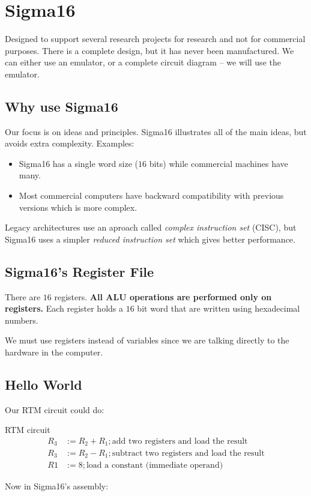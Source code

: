 \section{Sigma16}\label{sec:sigma16}

Designed to support several research projects for research and not for commercial purposes.
There is a complete design, but it has never been manufactured.
We can either use an emulator, or a complete circuit diagram -- we will use the emulator.

\subsection{Why use Sigma16}\label{sub:why_use_sigma16}

Our focus is on ideas and principles.
Sigma16 illustrates all of the main ideas, but avoids extra complexity.
Examples:
\begin{itemize}
    \item Sigma16 has a single word size (\(16\) bits) while commercial machines have many.
    \item Most commercial computers have backward compatibility with previous versions which is more complex.
\end{itemize}
Legacy architectures use an aproach called \emph{complex instruction set} (CISC), but Sigma16 uses a simpler \emph{reduced instruction set} which gives better performance.

\subsection{Sigma16's Register File}\label{sub:sigma16_s_register_file}

There are \(16\) registers.
\textbf{All ALU operations are performed only on registers.}
Each register holds a \(16\) bit word that are written using hexadecimal numbers.

We must use registers instead of variables since we are talking directly to the hardware in the computer.

\subsection{Hello World}\label{sub:hello_world}

Our RTM circuit could do:
\begin{highlight}{RTM circuit}
    \begin{align*}
        R_3 & := R_2+R_1 ; \text{add two registers and load the result}     \\
        R_3 & :=R_2-R_1 ; \text{subtract two registers and load the result} \\
        R1  & := 8 ; \text{load a constant (immediate operand)}
    \end{align*}
\end{highlight}
Now in Sigma16's assembly:

